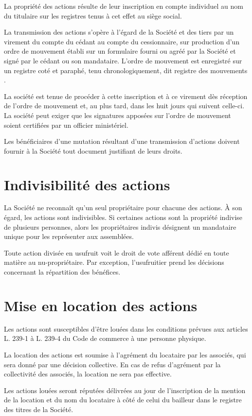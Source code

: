 \documentclass[a4paper,12pt]{report}
\begin{document}
La propriété des actions résulte de leur inscription en compte individuel au nom du titulaire sur les registres tenus à cet effet au siège social.

La transmission des actions s'opère à l'égard de la Société et des tiers par un virement du compte du cédant au compte du cessionnaire, 
sur production d'un ordre de mouvement établi sur un formulaire fourni ou agréé par la Société et signé par le cédant ou son mandataire. 
L'ordre de mouvement est enregistré sur un registre coté et paraphé, tenu chronologiquement, dit \og registre des mouvements \fg{}.

La société est tenue de procéder à cette inscription et à ce virement dès réception de l'ordre de mouvement et, au plus tard, dans les huit jours qui suivent celle-ci. 
La société peut exiger que les signatures apposées sur l'ordre de mouvement soient certifiées par un officier ministériel.

Les bénéficiaires d'une mutation résultant d'une transmission d'actions doivent fournir à la Société tout document justifiant de leurs droits.

\section{Indivisibilité des actions}
La Société ne reconnaît qu'un seul propriétaire pour chacune des actions. À son égard, les actions sont indivisibles. 
Si certaines actions sont la propriété indivise de plusieurs personnes, 
alors les propriétaires indivis désignent un mandataire unique pour les représenter aux assemblées.

Toute action divisée en usufruit voit le droit de vote afférent dédié en toute matière au nu-propriétaire. 
Par exception, l'usufruitier prend les décisions concernant la répartition des bénéfices.

\section{Mise en location des actions}
Les actions sont susceptibles d'être louées dans les conditions prévues aux articles L. 239-1 à L. 239-4 du Code de commerce à une personne physique.

La location des actions est soumise à l'agrément du locataire par les associés, qui sera donné par une décision collective. 
En cas de refus d'agrément par la collectivité des associés, la location ne sera pas effective.

Les actions louées seront réputées délivrées au jour de l'inscription de la mention de la location et du nom du locataire 
à côté de celui du bailleur dans le registre des titres de la Société.
\end{document}
